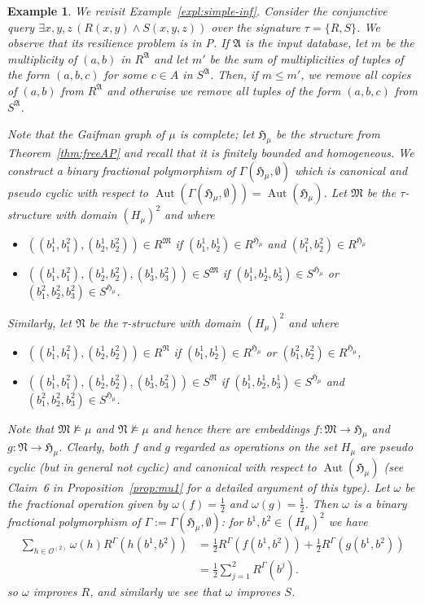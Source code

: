 \documentclass[nonacm]{acmart}
\newcommand{\bA}{{\mathfrak A}}
\newcommand{\bH}{{\mathfrak H}}
\newcommand{\bM}{{\mathfrak M}}
\newcommand{\bN}{{\mathfrak N}}
\DeclareMathOperator{\Aut}{Aut}
\newtheorem{expl}[theorem]{Example}
\begin{document}
\begin{expl}\label{expl:simple-inf-rev}
We revisit Example~\ref{expl:simple-inf}. Consider the conjunctive query
$\exists x,y,z \, (R(x,y) \wedge S(x,y,z))$ over the signature $\tau = \{R,S\}$.
We observe that its resilience problem is in P. If $\bA$ is the input database, let $m$ be the multiplicity of $(a,b)$ in $R^\bA$ and let $m'$ be the sum of multiplicities of tuples of the form $(a,b,c)$ for some $c \in A$ in $S^\bA$. Then, if $m \leq m'$, we remove all copies of $(a,b)$ from $R^\bA$ and otherwise we remove all tuples of the form $(a,b,c)$ from $S^\bA$.

Note that the Gaifman graph of $\mu$ is complete; let $\bH_\mu$ be the structure from Theorem~\ref{thm:freeAP} and recall that it is finitely bounded and homogeneous. We construct a binary fractional polymorphism of $\Gamma(\bH_\mu, \emptyset)$ which is canonical and pseudo cyclic with respect to $\Aut(\Gamma(\bH_\mu, \emptyset)) = \Aut(\bH_\mu)$. 
Let $\bM$ be the $\tau$-structure with
domain $(H_\mu)^2$ 
and where 
\begin{itemize} 
\item $((b^1_1,b^2_1),(b^1_2,b^2_2)) \in R^{\bM}$ if 
$(b^1_1,b^1_2) \in R^{\bH_\mu}$ and 
$(b^2_1,b^2_2) \in R^{\bH_\mu}$ 
\item $((b^1_1,b^2_1),(b^1_2,b^2_2),(b^1_3,b^2_3)) \in S^{\bM}$ if
$(b^1_1,b^1_2,b^1_3) \in S^{\bH_\mu}$ or 
$(b^2_1,b^2_2,b^2_3) \in S^{\bH_\mu}$. 
\end{itemize}
Similarly, let $\bN$ be the $\tau$-structure with
domain $(H_\mu)^2$ 
and where 
\begin{itemize} 
\item $((b^1_1,b^2_1),(b^1_2,b^2_2)) \in R^{\bN}$ if 
$(b^1_1,b^1_2) \in R^{\bH_\mu}$ or 
$(b^2_1,b^2_2) \in R^{\bH_\mu}$,
\item $((b^1_1,b^2_1),(b^1_2,b^2_2),(b^1_3,b^2_3)) \in S^{\bN}$ if 
$(b^1_1,b^1_2,b^1_3) \in S^{\bH_\mu}$ and 
$(b^2_1,b^2_2,b^2_3) \in S^{\bH_\mu}$. 
\end{itemize}
Note that $\bM \not \models \mu$ and $\bN \not \models \mu$ and hence 
there are embeddings $f \colon \bM \to \bH_\mu$
and $g \colon \bN \to \bH_\mu$.
Clearly, both $f$ and $g$ regarded as operations on the set $H_\mu$ are pseudo cyclic (but in general not cyclic) and canonical with respect to $\Aut(\bH_\mu)$ (see Claim~6 in Proposition~\ref{prop:mu1} for a detailed argument of this type). Let $\omega$ be the fractional operation given by $\omega(f) = \frac{1}{2}$ and $\omega(g) = \frac{1}{2}$. 
Then $\omega$ is a binary fractional polymorphism of $\Gamma := \Gamma(\bH_\mu,\emptyset)$:
for $b^1,b^2 \in (H_\mu)^2$ we have
\begin{align}
\sum_{h \in {\mathscr O}^{(2)}} \omega(h) R^{\Gamma}(h(b^1,b^{2})) & = \frac{1}{2} R^{\Gamma}(f(b^1,b^2)) + \frac{1}{2} R^{\Gamma}(g(b^1,b^2)) \nonumber \\ 
& =
\frac{1}{2} \sum_{j = 1}^2 R^{\Gamma}(b^j). 
\label{eq:submod}
\end{align}
so $\omega$ improves $R$, and similarly we see that $\omega$ improves $S$. 


\end{expl}
\end{document}
